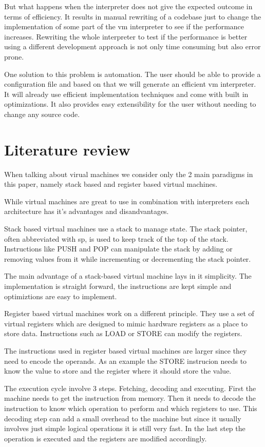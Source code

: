 \documentclass{article}
\begin{document}
But what happens when the interpreter does not give the expected outcome in
terms of efficiency. It results in manual rewriting of a codebase just to
change the implementation of some part of the vm interpreter to see if the
performance increases.
Rewriting the whole interpreter to test if the performance is better using
a different development approach is not only time consuming but also error 
prone.

One solution to this problem is automation. The user should be able to provide
a configuration file and based on that we will generate an efficient vm 
interpreter. It will already use efficient implementation techniques and come
with built in optimizations. It also provides easy extensibility for the user
without needing to change any source code.

\section{Literature review}
When talking about virual machines we consider only the 2 main paradigms in
this paper, namely stack based and register based virtual machines.

While virtual machines are great to use in combination with interpreters
each architecture has it's advantages and disandvantages.

Stack based virtual machines use a stack to manage state. The stack pointer,
often abbreviated with sp, is used to keep track of the top of the stack.
Instructions like PUSH and POP can manipulate the stack by adding or removing
values from it while incrementing or decrementing the stack pointer.

The main advantage of a stack-based virtual machine lays in it simplicity.
The implementation is straight forward, the instructions are kept simple
and optimiztions are easy to implement.


Register based virtual machines work on a different principle. They use a set of
virtual registers which are designed to mimic hardware registers as a place to
store data. Instructions such as LOAD or STORE can modify the registers.

The instructions used in register based virtual machines are larger since they
need to encode the operands. As an example the STORE instrucion needs to know 
the value to store and the register where it should store the value.

The execution cycle involve 3 steps. Fetching, decoding and executing. First
the machine needs to get the instruction from memory. Then it needs to decode
the instruction to know which operation to perform and which registers to use.
This decoding step can add a small overhead to the machine but since it usually
involves just simple logical operations it is still very fast. In the last step
the operation is executed and the registers are modified accordingly.
\end{document}
